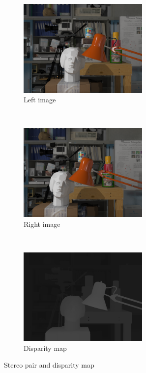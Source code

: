 \begin{figure}[h!]
\centering
\begin{subfigure}[]{0.4\textwidth}
\centering
\includegraphics[width=0.7\textwidth]{./img/left.png}
\caption{\scriptsize{Left image}}
\end{subfigure}%
~ %
\begin{subfigure}[]{0.4\textwidth}
\centering
\includegraphics[width=0.7\textwidth]{./img/right.png}
\caption{\scriptsize{Right image}}
\end{subfigure} 
~\quad
\begin{subfigure}[]{0.4\textwidth}
\centering
\includegraphics[width=0.7\textwidth]{./img/disparity.png}
\caption{\scriptsize{Disparity map}}
\label{disparity}
\end{subfigure}%
\caption{\small{Stereo pair and disparity map}}
\end{figure}
